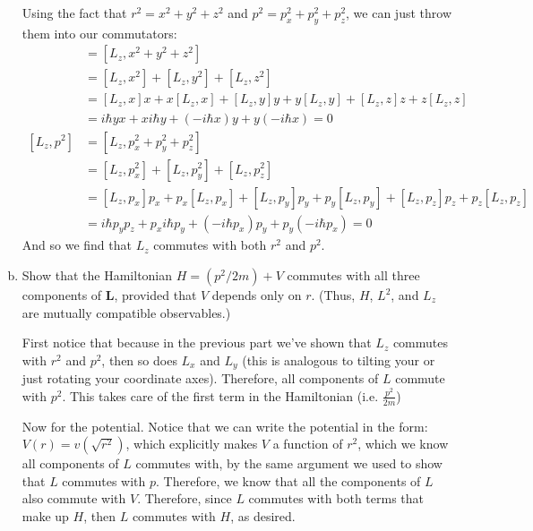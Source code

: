 \documentclass[10pt]{article}
\begin{document}
\begin{enumerate}[(a)]
        \begin{solution}
            Using the fact that $r^2 = x^2 + y^2 + z^2$ and $p^2 = p_x^2 + p_y^2 + p_z^2$, we can just throw them into our commutators:
                \begin{align*}
                    [L_z,r^2] &= [L_z, x^2 + y^2 + z^2] \\
                    &= [L_z,x^2] + [L_z,y^2] + [L_z,z^2] \\
                    &= [L_z,x]x + x[L_z,x] + [L_z,y]y + y[L_z,y] + [L_z,z]z + z[L_z,z] \\
                    &= i\hbar yx + xi\hbar y + (-i\hbar x)y + y(-i\hbar x) = 0\\
                    [L_z,p^2] &= [L_z, p_x^2 + p_y^2 + p_z^2]\\
                    &= [L_z,p_x^2] + [L_z,p_y^2] + [L_z,p_z^2]\\
                    &= [L_z,p_x]p_x + p_x[L_z,p_x] + [L_z,p_y]p_y + p_y[L_z,p_y] + [L_z,p_z]p_z + p_z[L_z,p_z]\\
                    &= i\hbar p_y p_z + p_x i\hbar p_y + (-i\hbar p_x)p_y + p_y(-i\hbar p_x) = 0
                \end{align*}
                And so we find that $L_z$ commutes with both $r^2$ and $p^2$.
        \end{solution}
        \item Show that the Hamiltonian $H = (p^2/2m) + V$ commutes with all three components of \textbf{L}, provided that $V$ depends only on $r$. (Thus, $H$, $L^2$, and $L_z$ are mutually compatible observables.)
        
        \begin{solution}
            First notice that because in the previous part we've shown that $L_z$ commutes with $r^2$ and $p^2$, then so does $L_x$ and $L_y$ (this is analogous to tilting your or just rotating your coordinate axes). Therefore, all components of $L$ commute with $p^2$. This takes care of the first term in the Hamiltonian (i.e. $\frac{p^2}{2m}$)

            Now for the potential. Notice that we can write the potential in the form: $V(r) = v(\sqrt{r^2})$, which explicitly makes $V$ a function of $r^2$, which we know all components of $L$ commutes with, by the same argument we used to show that $L$ commutes with $p$. Therefore, we know that all the components of $L$ also commute with $V$. Therefore, since $L$ commutes with both terms that make up $H$, then $L$ commutes with $H$, as desired.
        
        \end{solution}
    \end{enumerate}
\end{document}
